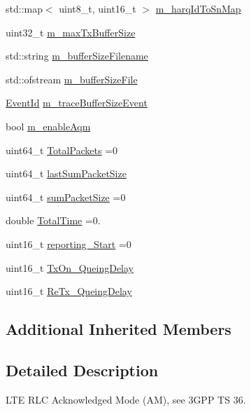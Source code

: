 \begin{DoxyCompactItemize}
\item 
std\+::map$<$ uint8\+\_\+t, uint16\+\_\+t $>$ \hyperlink{classns3_1_1LteRlcAm_aaa078272ccc8489a79b7c49cbac4b524}{m\+\_\+harq\+Id\+To\+Sn\+Map}
\item 
uint32\+\_\+t \hyperlink{classns3_1_1LteRlcAm_a8908966d4533f80cdd625392e47a4ffd}{m\+\_\+max\+Tx\+Buffer\+Size}
\item 
std\+::string \hyperlink{classns3_1_1LteRlcAm_a3d728f38f213edf4ce7fc8b467a37afd}{m\+\_\+buffer\+Size\+Filename}
\item 
std\+::ofstream \hyperlink{classns3_1_1LteRlcAm_add6ad953f73530083ca80e231d326726}{m\+\_\+buffer\+Size\+File}
\item 
\hyperlink{classns3_1_1EventId}{Event\+Id} \hyperlink{classns3_1_1LteRlcAm_aa169d74e10e693ed9d02ceaa885de6ac}{m\+\_\+trace\+Buffer\+Size\+Event}
\item 
bool \hyperlink{classns3_1_1LteRlcAm_a2145cf1ab8d6cffc3afaf172336291aa}{m\+\_\+enable\+Aqm}
\item 
uint64\+\_\+t \hyperlink{classns3_1_1LteRlcAm_a1b03629adba01263bcdb8a64606eddea}{Total\+Packets} =0
\item 
uint64\+\_\+t \hyperlink{classns3_1_1LteRlcAm_a37135b151c291c00f8d0345f8f442561}{last\+Sum\+Packet\+Size}
\item 
uint64\+\_\+t \hyperlink{classns3_1_1LteRlcAm_ad22cb06ab4ce74b0749390193dfb7dfb}{sum\+Packet\+Size} =0
\item 
double \hyperlink{classns3_1_1LteRlcAm_a7ea7ad8fc456ed782e8d18b33ece017b}{Total\+Time} =0.
\item 
uint16\+\_\+t \hyperlink{classns3_1_1LteRlcAm_a1c05588e8826e0c324eaf12ace9378fd}{reporting\+\_\+\+Start} =0
\item 
uint16\+\_\+t \hyperlink{classns3_1_1LteRlcAm_a3f8140197bec7546c991d67f4416c768}{Tx\+On\+\_\+\+Queing\+Delay}
\item 
uint16\+\_\+t \hyperlink{classns3_1_1LteRlcAm_ad498f40df8e3906dc0e149575aceee0c}{Re\+Tx\+\_\+\+Queing\+Delay}
\end{DoxyCompactItemize}
\subsection*{Additional Inherited Members}


\subsection{Detailed Description}
L\+TE R\+LC Acknowledged Mode (AM), see 3\+G\+PP TS 36. 

